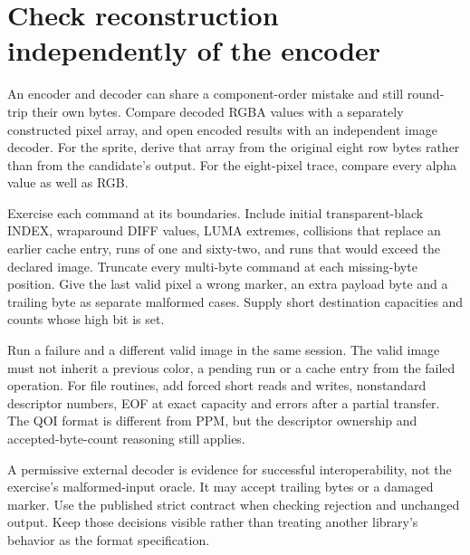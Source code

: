 \section{Check reconstruction independently of the encoder}
An encoder and decoder can share a component-order mistake and still round-trip their
own bytes. Compare decoded RGBA values with a separately constructed pixel array, and
open encoded results with an independent image decoder. For the sprite, derive that
array from the original eight row bytes rather than from the candidate's output.
For the eight-pixel trace, compare every alpha value as well as RGB.

Exercise each command at its boundaries. Include initial transparent-black INDEX,
wraparound DIFF values, LUMA extremes, collisions that replace an earlier cache entry,
runs of one and sixty-two, and runs that would exceed the declared image. Truncate
every multi-byte command at each missing-byte position. Give the last valid pixel a
wrong marker, an extra payload byte and a trailing byte as separate malformed cases.
Supply short destination capacities and counts whose high bit is set.

Run a failure and a different valid image in the same session. The valid image must
not inherit a previous color, a pending run or a cache entry from the failed operation.
For file routines, add forced short reads and writes, nonstandard descriptor numbers,
EOF at exact capacity and errors after a partial transfer. The QOI format is different
from PPM, but the descriptor ownership and accepted-byte-count reasoning still applies.

A permissive external decoder is evidence for successful interoperability, not the
exercise's malformed-input oracle. It may accept trailing bytes or a damaged marker.
Use the published strict contract when checking rejection and unchanged output. Keep
those decisions visible rather than treating another library's behavior as the format
specification.
